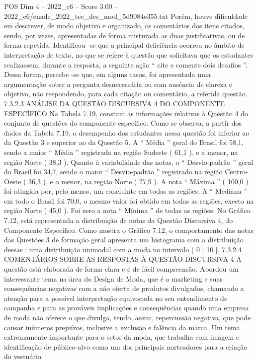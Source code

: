 \begin{textsample}{POS Dim 4 – 2022\_c6 – Score 3.00 – 2022\_c6/enade\_2022\_tec\_des\_mod\_5d9084e355.txt}
Porém, houve dificuldade em descrever, de modo objetivo e organizado, os comentários dos itens citados, sendo, por vezes, apresentadas de forma misturada as duas justificativas, ou de forma repetida.
Identificou -se que a principal deficiência ocorreu no âmbito de interpretação de texto, no que se refere à questão que solicitava que os estudantes realizassem, durante a resposta, a seguinte ação “ cite e comente dois desafios ”.
Dessa forma, percebe -se que, em alguns casos, foi apresentada uma argumentação sobre a pergunta desnecessária ou com ausência de clareza e objetivo, não respondendo, para cada citação ou comentário, a referida questão. 7.3.2.3 ANÁLISE DA QUESTÃO DISCURSIVA 4 DO COMPONENTE ESPECÍFICO Na Tabela 7.19, constam as informações relativas à Questão 4 do conjunto de questões do componente específico.
Como se observa, a partir dos dados da Tabela 7.19, o desempenho dos estudantes nessa questão foi inferior ao da Questão 3 e superior ao da Questão 5.
A “ Média ” geral do Brasil foi 58,1, sendo a maior “ Média ” registrada na região Sudeste ( 61,1 ), e a menor, na região Norte ( 38,3 ).
Quanto à variabilidade das notas, o “ Desvio-padrão ” geral do Brasil foi 34,7, sendo o maior “ Desvio-padrão ” registrado na região Centro-Oeste ( 36,3 ), e o menor, na região Norte ( 27,9 ).
A nota “ Máxima ” ( 100,0 ) foi atingida por, pelo menos, um concluinte em todas as regiões.
A “ Mediana ” em todo o Brasil foi 70,0, o mesmo valor foi obtido em todas as regiões, exceto na região Norte ( 45,0 ).
Foi zero a nota “ Mínima ” de todas as regiões.
No Gráfico 7.12, está representada a distribuição de notas da Questão Discursiva 4, do Componente Específico.
Como mostra o Gráfico 7.12, o comportamento das notas das Questões 3 de formação geral apresenta um histograma com a distribuição dessas : uma distribuição unimodal com a moda no intervalo ( 0 ; 10 ]. 7.3.2.4 COMENTÁRIOS SOBRE AS RESPOSTAS À QUESTÃO DISCURSIVA 4 A questão está elaborada de forma clara e é de fácil compreensão.
Abordou um interessante tema na área do Design de Moda, que é o marketing e suas consequências negativas com a não oferta de produtos divulgados, chamando a atenção para a possível interpretação equivocada no seu entendimento de campanha e para as prováveis implicações e consequências quando uma empresa de moda não oferece o que divulga, tendo, assim, repercussão negativa, que pode causar inúmeros prejuízos, inclusive a exclusão e falência da marca.
Um tema extremamente importante para o setor da moda, que trabalha com imagem e identificação de público-alvo como um dos principais norteadores para a criação do vestuário.

\end{textsample}
